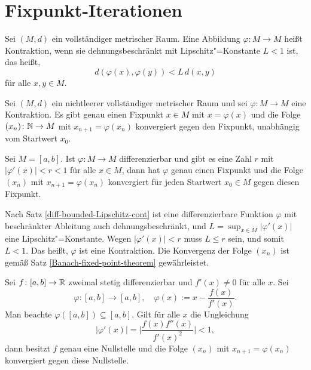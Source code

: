 \newpage
\section{Fixpunkt-Iterationen}%

\begin{Definition}[Kontraktion]
Sei $(M,d)$ ein vollständiger metrischer Raum. Eine Abbildung
$\varphi\colon M\to M$ heißt Kontraktion, wenn sie
dehnungsbeschränkt mit Lipschitz"=Konstante $L<1$ ist, das heißt,
\[d(\varphi(x),\varphi(y))<L\,d(x,y)\]
für alle $x,y\in M$.
\end{Definition}

\begin{Satz}\label{Banach-fixed-point-theorem}%
Sei $(M,d)$ ein nichtleerer vollständiger metrischer Raum
und sei $\varphi\colon M\to M$ eine Kontraktion. Es gibt genau
einen Fixpunkt $x\in M$ mit $x=\varphi(x)$ und die Folge
$(x_n)\colon\mathbb N\to M$ mit $x_{n+1}=\varphi(x_n)$ konvergiert
gegen den Fixpunkt, unabhängig vom Startwert $x_0$.
\end{Satz}

\begin{Satz}\label{diff-fixed-point-iter}
Sei $M=[a,b]$. Ist $\varphi\colon M\to M$ differenzierbar und gibt es
eine Zahl $r$ mit $|\varphi'(x)|<r<1$ für alle $x\in M$, dann
hat $\varphi$ genau einen Fixpunkt und die Folge $(x_n)$ mit $x_{n+1}=\varphi(x_n)$
konvergiert für jeden Startwert $x_0\in M$ gegen diesen Fixpunkt.
\end{Satz}
\begin{Beweis}
Nach Satz \ref{diff-bounded-Lipschitz-cont} ist eine differenzierbare
Funktion $\varphi$ mit beschränkter Ableitung auch dehnungsbeschränkt,
und $L=\sup_{x\in M}|\varphi'(x)|$ eine Lipschitz"=Konstante.
Wegen $|\varphi'(x)|<r$ muss $L\le r$ sein, und somit $L<1$.
Das heißt, $\varphi$ ist eine Kontraktion. Die Konvergenz der Folge
$(x_n)$ ist gemäß Satz \ref{Banach-fixed-point-theorem}
gewährleistet.\;\qedsymbol
\end{Beweis}

\begin{Satz}%
\newlinefirst
Sei $f\colon [a,b]\to\mathbb R$ zweimal stetig differenzierbar und
$f'(x)\ne 0$ für alle $x$. Sei%
\[\varphi\colon [a,b]\to [a,b],\quad \varphi(x):=x-\frac{f(x)}{f'(x)}.\]
Man beachte $\varphi([a,b])\subseteq [a,b]$. Gilt für alle $x$ die Ungleichung%
\[|\varphi'(x)| = \bigg|\frac{f(x)f''(x)}{f'(x)^2}\bigg| < 1,\]
dann besitzt $f$ genau eine Nullstelle und die Folge $(x_n)$ mit
$x_{n+1}=\varphi(x_n)$ konvergiert gegen diese Nullstelle.
\end{Satz}

